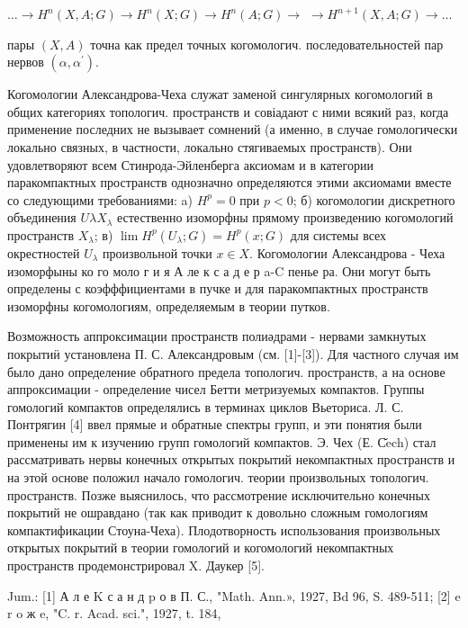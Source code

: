 \documentclass[10pt]{article}
\begin{document}
$\ldots \rightarrow H^{n}(X, A ; G) \rightarrow H^{n}(X ; G) \rightarrow H^{n}(A ; G) \rightarrow$ $\rightarrow H^{n+1}(X, A ; G) \rightarrow \ldots$



пары $(X, A)$ точна как предел точных когомологич. последовательностей пар нервов $\left(\alpha, \alpha^{\prime}\right)$.



Когомологии Александрова-Чеха служат заменой сингулярных когомологий в общих категориях топологич. пространств и совіадают с ними всякий раз, когда применение последних не вызывает сомнений (а именно, в случае гомологически локально связных, в частности, локально стягиваемых пространств). Они удовлетворяют всем Стинрода-Эйленберга аксиомам и в категории паракомпактных пространств однозначно определяются этими аксиомами вместе со следующими требованиями: a) $H^{p}=0$ при $p<0$; б) когомологии дискретного объединения $U \lambda X_{\lambda}$ естественно изоморфны прямому произведению когомологий пространств $X_{\lambda}$; в) $\lim H^{p}\left(U_{\lambda} ; G\right)=H^{p}(x ; G)$ для системы всех окрестностей $U_{\lambda}$ произвольной точки $x \in X$. Когомологии Александрова - Чеха изоморфыны ко го моло г и я А ле к с а д е р a-C пенье ра. Они могут быть определены с коэфффициентами в пучке и для паракомпактных пространств изоморфны когомологиям, определяемым в теории путков.



Возможность аппроксимации пространств полиәдрами - нервами замкнутых покрытиӥ установлена П. С. Александровым (см. [1]-[3]). Для частного случая им было дано определение обратного предела топологич. пространств, а на основе аппроксимации - определение чисел Бетти метризуемых компактов. Группы гомологий компактов определялись в терминах циклов Вьеториса. Л. С. Понтрягин [4] ввел прямые и обратные спектры групп, и эти понятия были применены им к изучению групп гомологий компактов. Э. Чех (Е. С̌ech) стал рассматривать нервы конечных открытых покрытий некомпактных пространств и на этой основе положил начало гомологич. теории произвольных топологич. пространств. Позже выяснилось, что рассмотрение исключительно конечных покрытий не ошравдано (так как приводит к довольно сложным гомологиям компактификации Стоуна-Чеха). Плодотворность использования произвольных открытых покрытий в теории гомологий и когомологий некомпактных пространств продемонстрировал X. Даукер [5].



Jum.: [1] А л е K с а н д $\mathrm{p}$ о в П. С., "Math. Ann.», 1927, Bd 96, S. 489-511; [2] e r o ж e, "C. r. Acad. sci.", 1927, t. 184,
\end{document}
